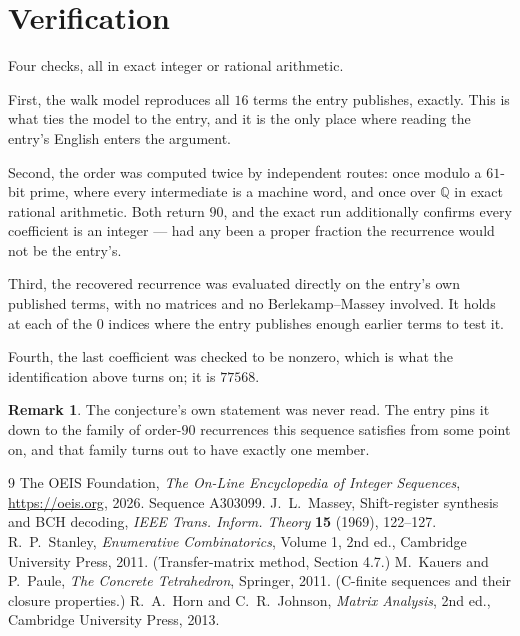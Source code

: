 \documentclass[11pt,a4paper]{article}
\theoremstyle{plain}
\theoremstyle{definition}
\newtheorem{remark}[theorem]{Remark}
\begin{document}
\section{Verification}

Four checks, all in exact integer or rational arithmetic.

First, the walk model reproduces all $16$ terms the entry publishes, exactly. This is
what ties the model to the entry, and it is the only place where reading the entry's English
enters the argument.

Second, the order was computed twice by independent routes: once modulo a $61$-bit prime, where
every intermediate is a machine word, and once over $\mathbb{Q}$ in exact rational arithmetic.
Both return $90$, and the exact run additionally confirms every coefficient is an integer
--- had any been a proper fraction the recurrence would not be the entry's.

Third, the recovered recurrence was evaluated directly on the entry's own published terms, with
no matrices and no Berlekamp--Massey involved. It holds at each of the $0$ indices where
the entry publishes enough earlier terms to test it.

Fourth, the last coefficient was checked to be nonzero, which is what the identification above
turns on; it is $77568$.

\begin{remark}
The conjecture's own statement was never read. The entry pins it down to the family of
order-$90$ recurrences this sequence satisfies from some point on, and that family turns
out to have exactly one member.
\end{remark}

\begin{thebibliography}{9}
 The OEIS Foundation, \emph{The On-Line Encyclopedia of Integer
Sequences}, \url{https://oeis.org}, 2026. Sequence A303099.
 J.~L.~Massey, Shift-register synthesis and BCH decoding, \emph{IEEE
Trans. Inform. Theory} \textbf{15} (1969), 122--127.
 R.~P.~Stanley, \emph{Enumerative Combinatorics}, Volume 1, 2nd ed.,
Cambridge University Press, 2011. (Transfer-matrix method, Section 4.7.)
 M.~Kauers and P.~Paule, \emph{The Concrete Tetrahedron}, Springer, 2011.
(C-finite sequences and their closure properties.)
 R.~A.~Horn and C.~R.~Johnson, \emph{Matrix Analysis}, 2nd ed., Cambridge
University Press, 2013.
\end{thebibliography}
\end{document}
